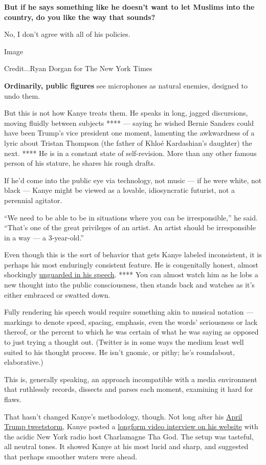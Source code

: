 \textbf{But if he says something like he doesn't want to let Muslims
into the country, do you like the way that sounds?}

No, I don't agree with all of his policies.

Image

Credit...Ryan Dorgan for The New York Times

\textbf{Ordinarily, public figures} see microphones as natural enemies,
designed to undo them.

But this is not how Kanye treats them. He speaks in long, jagged
discursions, moving fluidly between subjects **** --- saying he wished
Bernie Sanders could have been Trump's vice president one moment,
lamenting the awkwardness of a lyric about Tristan Thompson (the father
of Khloé Kardashian's daughter) the next. **** He is in a constant state
of self-revision. More than any other famous person of his stature, he
shares his rough drafts.

If he'd come into the public eye via technology, not music --- if he
were white, not black --- Kanye might be viewed as a lovable,
idiosyncratic futurist, not a perennial agitator.

``We need to be able to be in situations where you can be
irresponsible,'' he said. ``That's one of the great privileges of an
artist. An artist should be irresponsible in a way --- a 3-year-old.''

Even though this is the sort of behavior that gets Kanye labeled
inconsistent, it is perhaps his most enduringly consistent feature. He
is congenitally honest, almost shockingly
\href{https://www.youtube.com/watch?v=zIUzLpO1kxI}{unguarded in his
speech}. **** You can almost watch him as he lobs a new thought into the
public consciousness, then stands back and watches as it's either
embraced or swatted down.

Fully rendering his speech would require something akin to musical
notation --- markings to denote speed, spacing, emphasis, even the
words' seriousness or lack thereof, or the percent to which he was
certain of what he was saying as opposed to just trying a thought out.
(Twitter is in some ways the medium least well suited to his thought
process. He isn't gnomic, or pithy; he's roundabout, elaborative.)

This is, generally speaking, an approach incompatible with a media
environment that ruthlessly records, dissects and parses each moment,
examining it hard for flaws.

That hasn't changed Kanye's methodology, though. Not long after his
\href{https://www.nytimes3xbfgragh.onion/2018/04/25/us/politics/kanye-west-trump-twitter-maga.html}{April
Trump tweetstorm}, Kanye posted a
\href{https://www.nytimes3xbfgragh.onion/2018/05/01/arts/music/kanye-west-charlamagne-interview-tmz.html}{longform
video interview on his website} with the acidic New York radio host
Charlamagne Tha God. The setup was tasteful, all neutral tones. It
showed Kanye at his most lucid and sharp, and suggested that perhaps
smoother waters were ahead.

